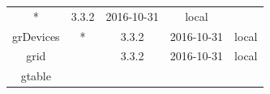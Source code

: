 \documentclass[]{article}
\begin{document}
\begin{itemize}
\begin{longtable}[]{@{}ccccc@{}}
\begin{minipage}[t]{0.05\columnwidth}
  *\strut
  \end{minipage} & \begin{minipage}[t]{0.13\columnwidth}\centering\strut
  3.3.2\strut
  \end{minipage} & \begin{minipage}[t]{0.13\columnwidth}\centering\strut
  2016-10-31\strut
  \end{minipage} & \begin{minipage}[t]{0.29\columnwidth}\centering\strut
  local\strut
  \end{minipage}\tabularnewline
  \begin{minipage}[t]{0.13\columnwidth}\centering\strut
  grDevices\strut
  \end{minipage} & \begin{minipage}[t]{0.05\columnwidth}\centering\strut
  *\strut
  \end{minipage} & \begin{minipage}[t]{0.13\columnwidth}\centering\strut
  3.3.2\strut
  \end{minipage} & \begin{minipage}[t]{0.13\columnwidth}\centering\strut
  2016-10-31\strut
  \end{minipage} & \begin{minipage}[t]{0.29\columnwidth}\centering\strut
  local\strut
  \end{minipage}\tabularnewline
  \begin{minipage}[t]{0.13\columnwidth}\centering\strut
  grid\strut
  \end{minipage} & \begin{minipage}[t]{0.05\columnwidth}\centering\strut
  \strut
  \end{minipage} & \begin{minipage}[t]{0.13\columnwidth}\centering\strut
  3.3.2\strut
  \end{minipage} & \begin{minipage}[t]{0.13\columnwidth}\centering\strut
  2016-10-31\strut
  \end{minipage} & \begin{minipage}[t]{0.29\columnwidth}\centering\strut
  local\strut
  \end{minipage}\tabularnewline
  \begin{minipage}[t]{0.13\columnwidth}\centering\strut
  gtable\strut
  \end{minipage} & \begin{minipage}[t]{0.05\columnwidth}\centering\strut
  \strut
  \end{minipage} & \begin{minipage}[t]{0.13\columnwidth}\centering\strut

\end{minipage}
\end{longtable}
\end{itemize}
\end{document}
